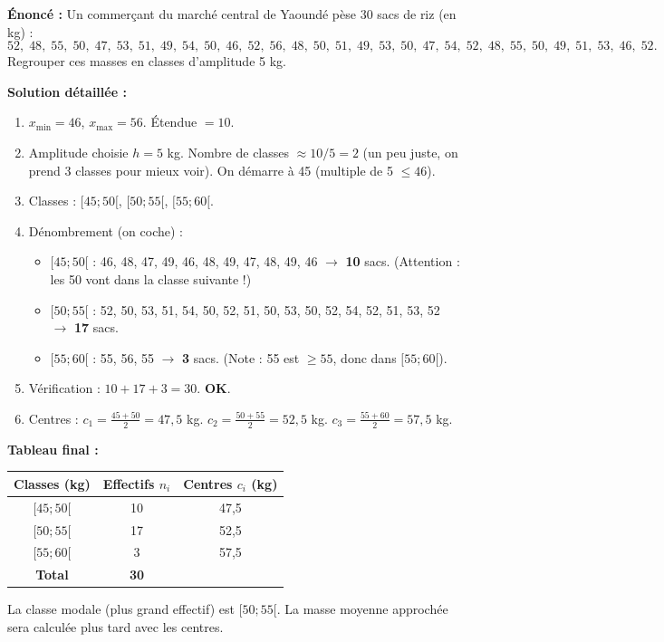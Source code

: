 \documentclass[11pt]{article}
\begin{document}
\begin{exoresolu}
\textbf{Énoncé :} Un commerçant du marché central de Yaoundé pèse 30 sacs de riz (en kg) :
\[
52,\; 48,\; 55,\; 50,\; 47,\; 53,\; 51,\; 49,\; 54,\; 50,\;
46,\; 52,\; 56,\; 48,\; 50,\; 51,\; 49,\; 53,\; 50,\; 47,\;
54,\; 52,\; 48,\; 55,\; 50,\; 49,\; 51,\; 53,\; 46,\; 52.
\]
Regrouper ces masses en classes d'amplitude 5 kg.

\textbf{Solution détaillée :}
\begin{enumerate}
    \item $x_{\min} = 46$, $x_{\max} = 56$. Étendue $= 10$.
    \item Amplitude choisie $h = 5$ kg. Nombre de classes $\approx 10/5 = 2$ (un peu juste, on prend 3 classes pour mieux voir). On démarre à 45 (multiple de 5 $\le 46$).
    \item Classes : $[45 ; 50[$, $[50 ; 55[$, $[55 ; 60[$.
    \item Dénombrement (on coche) :
    \begin{itemize}
        \item $[45 ; 50[$ : 46, 48, 47, 49, 46, 48, 49, 47, 48, 49, 46 $\rightarrow$ \textbf{10} sacs. (Attention : les 50 vont dans la classe suivante !)
        \item $[50 ; 55[$ : 52, 50, 53, 51, 54, 50, 52, 51, 50, 53, 50, 52, 54, 52, 51, 53, 52 $\rightarrow$ \textbf{17} sacs.
        \item $[55 ; 60[$ : 55, 56, 55 $\rightarrow$ \textbf{3} sacs. (Note : 55 est $\ge 55$, donc dans $[55;60[$).
    \end{itemize}
    \item Vérification : $10 + 17 + 3 = 30$. \textbf{OK}.
    \item Centres :
    $c_1 = \frac{45+50}{2} = 47,5$ kg.
    $c_2 = \frac{50+55}{2} = 52,5$ kg.
    $c_3 = \frac{55+60}{2} = 57,5$ kg.
\end{enumerate}

\textbf{Tableau final :}
\begin{center}
\begin{tabular}{|c|c|c|}\hline
\textbf{Classes (kg)} & \textbf{Effectifs $n_i$} & \textbf{Centres $c_i$ (kg)} \\ \hline
$[45 ; 50[$ & 10 & 47,5 \\ \hline
$[50 ; 55[$ & 17 & 52,5 \\ \hline
$[55 ; 60[$ & 3 & 57,5 \\ \hline
\textbf{Total} & \textbf{30} & \\ \hline
\end{tabular}
\end{center}
La classe modale (plus grand effectif) est $[50 ; 55[$. La masse moyenne approchée sera calculée plus tard avec les centres.
\end{exoresolu}
\end{document}
